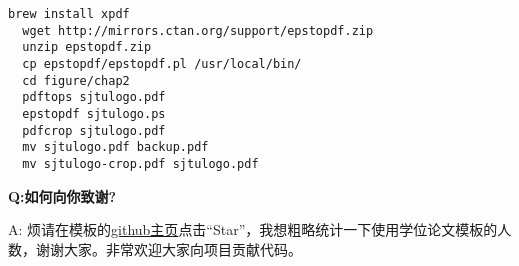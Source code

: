 \begin{lstlisting}[basicstyle=\small\ttfamily, caption={编译模板}, numbers=none]
  brew install xpdf
  wget http://mirrors.ctan.org/support/epstopdf.zip
  unzip epstopdf.zip
  cp epstopdf/epstopdf.pl /usr/local/bin/
  cd figure/chap2
  pdftops sjtulogo.pdf
  epstopdf sjtulogo.ps
  pdfcrop sjtulogo.pdf
  mv sjtulogo.pdf backup.pdf
  mv sjtulogo-crop.pdf sjtulogo.pdf
\end{lstlisting}

{\bfseries{}Q:如何向你致谢?}

A: 烦请在模板的\href{https://github.com/weijianwen/SJTUThesis}{github主页}点击“Star”，我想粗略统计一下使用学位论文模板的人数，谢谢大家。非常欢迎大家向项目贡献代码。
